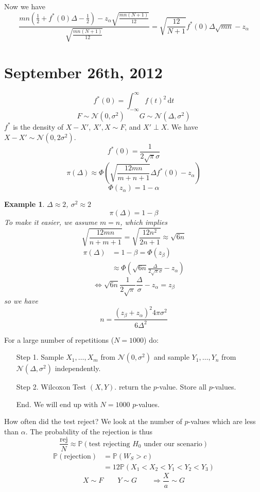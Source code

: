 \documentclass[a4paper,12pt]{amsart}
\newcommand{\dt}{\,\mathrm{d}t}
\newcommand{\p}[1]{\mathbb{P}\left(#1\right)}
\newtheorem{ex}{Example}
\begin{document}
Now we have
\[\frac{mn(\frac{1}{2} + f^*(0)\Delta - \frac{1}{2}) - z_\alpha \sqrt{\frac{mn(N+1)}{12}}}{\sqrt{\frac{mn(N+1)}{12}}} = \sqrt{\frac{12}{N+1}}f^*(0) \Delta \sqrt{mn} - z_\alpha\]

\section{September 26th, 2012}
\[f^*(0) = \int_{-\infty}^\infty \! f(t)^2 \dt\]
\[F \sim \mathcal{N}(0, \sigma^2) \qquad G \sim \mathcal{N}(\Delta,\sigma^2)\]
$f^*$ is the density of $X-X'$, $X',X \sim F$, and $X' \perp X$. We have $X-X' \sim \mathcal{N}(0,2\sigma^2)$.
\[f^*(0) = \frac{1}{2 \sqrt{\pi}\sigma}\]
\[\pi(\Delta) \approx \Phi\left(\sqrt{\frac{12mn}{m+n+1}}\Delta f^*(0) - z_\alpha \right)\]
\[\Phi(z_\alpha) = 1 - \alpha \]

\begin{ex}
$\Delta \approx 2$, $\sigma^2 \approx 2$
\[\pi(\Delta) = 1 - \beta\]
To make it easier, we assume $m=n$, which implies
\[\sqrt{\frac{12mn}{n+m+1}} = \sqrt{\frac{12n^2}{2n+1}} \approx \sqrt{6n} \]
\begin{align*}
\pi(\Delta) &= 1 - \beta = \Phi(z_\beta)\\
&\approx \Phi\left(\sqrt{6n} \frac{\Delta}{2 \sqrt{\pi} \sigma} - z_\alpha\right)
\end{align*}
\[\Leftrightarrow \sqrt{6n} \frac{1}{2 \sqrt{\pi}}\frac{\Delta}{\sigma} - z_\alpha = z_\beta\]
so we have
\[n = \frac{(z_\beta + z_\alpha)^2 4 \pi \sigma^2}{6 \Delta^2}\]
\end{ex}

For a large number of repetitions ($N=1000$) do:
\begin{itemize}
\item[Step 1.] Sample $X_1, \ldots, X_m$ from $\mathcal{N}(0,\sigma^2)$ and sample $Y_1,\ldots, Y_n$ from $\mathcal{N}(\Delta,\sigma^2)$ independently.
\item[Step 2.] Wilcoxon Test $(X,Y)$. return the $p$-value. Store all $p$-values.
\item[End.] We will end up with $N=1000$ $p$-values.
\end{itemize}
\noindent
How often did the test reject? We look at the number of $p$-values which are less than $\alpha$. The probability of the rejection is thus
\[\frac{\mbox{rej}}{N} \approx \p{\mbox{test rejecting }H_0 \mbox{ under our scenario}}\]
\begin{align*}
\p{\mbox{rejection}} &= \p{W_S>c}\\
&= 12 \p{X_1<X_2<Y_1<Y_2<Y_3}
\end{align*}
\[X \sim F \qquad Y \sim G \qquad \Rightarrow \frac{X}{a} \sim G\]
\end{document}
